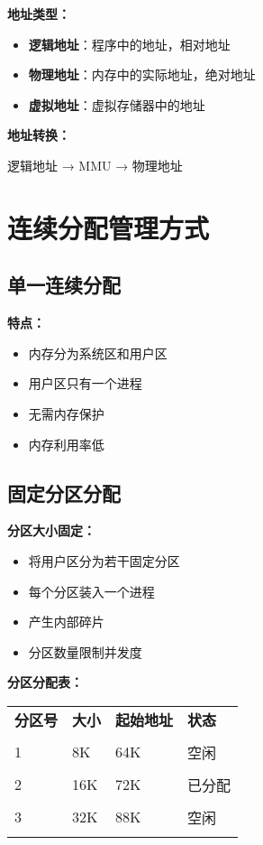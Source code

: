 \documentclass[lang=cn,newtx,10pt,scheme=chinese]{../../elegantbook}
\begin{document}
\textbf{地址类型：}
\begin{itemize}
  \item \textbf{逻辑地址}：程序中的地址，相对地址
  \item \textbf{物理地址}：内存中的实际地址，绝对地址
  \item \textbf{虚拟地址}：虚拟存储器中的地址
\end{itemize}

\textbf{地址转换：}
\begin{center}
逻辑地址 → MMU → 物理地址
\end{center}

\section{连续分配管理方式}

\subsection{单一连续分配}

\textbf{特点：}
\begin{itemize}
  \item 内存分为系统区和用户区
  \item 用户区只有一个进程
  \item 无需内存保护
  \item 内存利用率低
\end{itemize}

\subsection{固定分区分配}

\textbf{分区大小固定：}
\begin{itemize}
  \item 将用户区分为若干固定分区
  \item 每个分区装入一个进程
  \item 产生内部碎片
  \item 分区数量限制并发度
\end{itemize}

\textbf{分区分配表：}
\begin{longtable}{@{}p{3cm}p{3cm}p{3cm}p{3cm}@{}}
\toprule
\textbf{分区号} & \textbf{大小} & \textbf{起始地址} & \textbf{状态} \\\\ \midrule
\endhead

1 & 8K & 64K & 空闲 \\\\
2 & 16K & 72K & 已分配 \\\\
3 & 32K & 88K & 空闲 \\\\

\bottomrule
\end{longtable}
\end{document}
